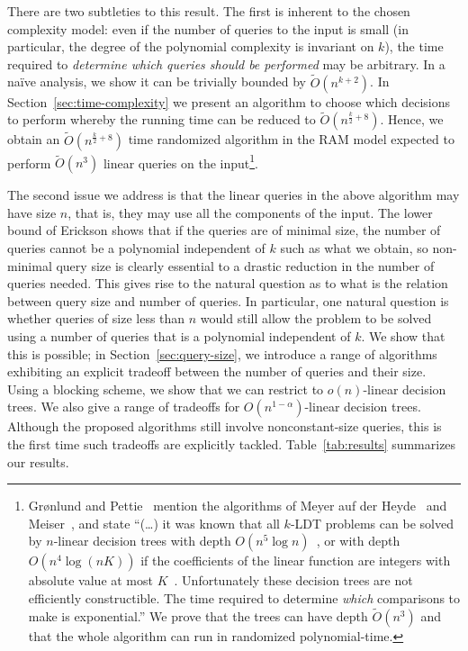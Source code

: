 There are two subtleties to this result. The first is inherent to the chosen
complexity model: even if the number of queries to the input is small (in
particular, the degree of the polynomial complexity is invariant on $k$), the
time required to \emph{determine which queries should be performed} may be
arbitrary. In a na\"ive analysis, we show it can be trivially bounded by
$\tilde{O}(n^{k+2})$. In Section~\ref{sec:time-complexity} we present an algorithm to
choose
which decisions to perform whereby the running time can be reduced to
$\tilde{O}(n^{\frac{k}{2}+8})$. Hence, we obtain an
$\tilde{O}(n^{\frac{k}{2}+8})$ time randomized algorithm in the RAM model
expected to perform $\tilde{O}(n^3)$ linear queries on the input\footnote{%
	Gr{\o}nlund and
	Pettie~\cite{GP18} mention the algorithms of Meyer auf der Heyde~\cite{M84} and
	Meiser~\cite{M93}, and state ``(\ldots) it was known that all \(k\)-LDT problems
	can be solved by $n$-linear decision trees with depth $O(n^5\log
	n)$~\cite{M93}, or with depth $O(n^4\log (nK))$ if the coefficients of the
	linear function are integers with absolute value at most $K$~\cite{M84}.
	Unfortunately these decision trees are not efficiently constructible. The
	time required to determine \emph{which} comparisons to make is
	exponential.'' We prove that the trees can have depth $\tilde{O}(n^3)$ and
	that the whole algorithm can run in randomized polynomial-time.}.

The second issue we address is that the linear queries in the above algorithm may
have size $n$, that is, they may use all the components of the input.
The lower bound of Erickson shows that if the queries are of minimal size, the number
of queries cannot be a polynomial independent of $k$ such as what we obtain, so
non-minimal query size is clearly essential to a drastic reduction in the number of queries needed.
This gives rise to the natural question as to what is the relation between query size and number of queries.
In particular, one natural question is whether queries of size less than $n$
would still allow the problem to be solved using a number of queries that is a
polynomial independent of $k$. We show that this is possible; in Section~\ref{sec:query-size},
we introduce a range of
algorithms exhibiting an explicit tradeoff between the number of queries and
their size. Using a blocking scheme, we show that we can restrict to
$o(n)$-linear decision trees. We also give a
range of tradeoffs for $O(n^{1-\alpha})$-linear decision trees. Although the
proposed algorithms still involve nonconstant-size queries, this is
the first time such tradeoffs are explicitly tackled. Table~\ref{tab:results} summarizes our results.

